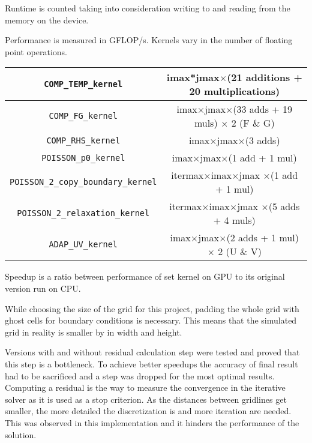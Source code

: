 
Runtime is counted taking into consideration writing to and reading from the memory on the device.

Performance is measured in GFLOP/s. Kernels vary in the number of floating point operations.


\begin{tabular}{|c|c|}
\hline 
\texttt{COMP\_TEMP\_kernel} & imax*jmax$\times$(21 additions + 20 multiplications) \\ 
\hline 
\texttt{COMP\_FG\_kernel} & imax$\times$jmax$\times$(33 adds + 19 muls) $\times$ 2 (F \& G) \\ 
\hline 
\texttt{COMP\_RHS\_kernel} & imax$\times$jmax$\times$(3 adds) \\ 
\hline 
\texttt{POISSON\_p0\_kernel} & imax$\times$jmax$\times$(1 add + 1 mul) \\ 
\hline 
\texttt{POISSON\_2\_copy\_boundary\_kernel} & itermax$\times$imax$\times$jmax $\times$(1 add + 1 mul) \\ 
\hline 
\texttt{POISSON\_2\_relaxation\_kernel} & itermax$\times$imax$\times$jmax $\times$(5 adds + 4 muls) \\ 
\hline 
\texttt{ADAP\_UV\_kernel} & imax$\times$jmax$\times$(2 adds + 1 mul) $\times$ 2 (U \& V) \\ 
\hline 
\end{tabular} 

Speedup is a ratio between performance of set kernel on GPU to its original version run on CPU.

While choosing the size of the grid for this project, padding the whole grid with ghost cells for boundary conditions is necessary. This means that the simulated grid in reality is smaller by in width and height.

Versions with and without residual calculation step were tested and proved that this step is a bottleneck. To achieve better speedups the accuracy of final result had to be sacrificed and a step was dropped for the most optimal results. Computing a residual is the way to measure the convergence in the iterative solver as it is used as a stop criterion. As the distances between gridlines get smaller, the more detailed the discretization is and more iteration are needed. This was observed in this implementation and it  hinders the performance of the solution.

